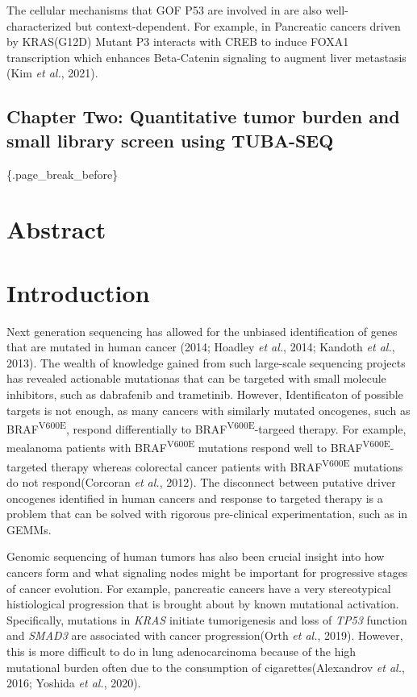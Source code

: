 The cellular mechanisms that GOF P53 are involved in are also well-characterized but context-dependent. For example, in Pancreatic cancers driven by KRAS(G12D) Mutant P3 interacts with CREB to induce FOXA1 transcription which enhances Beta-Catenin signaling to augment liver metastasis (Kim \emph{et al.}, 2021).

\hypertarget{chapter-two-quantitative-tumor-burden-and-small-library-screen-using-tuba-seq}{%
\subsection{Chapter Two: Quantitative tumor burden and small library screen using TUBA-SEQ}\label{chapter-two-quantitative-tumor-burden-and-small-library-screen-using-tuba-seq}}

\{.page\_break\_before\}

\hypertarget{abstract}{%
\section{Abstract}\label{abstract}}

\hypertarget{introduction}{%
\section{Introduction}\label{introduction}}

Next generation sequencing has allowed for the unbiased identification of genes that are mutated in human cancer (2014; Hoadley \emph{et al.}, 2014; Kandoth \emph{et al.}, 2013). The wealth of knowledge gained from such large-scale sequencing projects has revealed actionable mutationas that can be targeted with small molecule inhibitors, such as dabrafenib and trametinib. However, Identificaton of possible targets is not enough, as many cancers with similarly mutated oncogenes, such as BRAF\textsuperscript{V600E}, respond differentially to BRAF\textsuperscript{V600E}-targeed therapy. For example, mealanoma patients with BRAF\textsuperscript{V600E} mutations respond well to BRAF\textsuperscript{V600E}-targeted therapy whereas colorectal cancer patients with BRAF\textsuperscript{V600E} mutations do not respond(Corcoran \emph{et al.}, 2012). The disconnect between putative driver oncogenes identified in human cancers and response to targeted therapy is a problem that can be solved with rigorous pre-clinical experimentation, such as in GEMMs.

Genomic sequencing of human tumors has also been crucial insight into how cancers form and what signaling nodes might be important for progressive stages of cancer evolution. For example, pancreatic cancers have a very stereotypical histiological progression that is brought about by known mutational activation. Specifically, mutations in \emph{KRAS} initiate tumorigenesis and loss of \emph{TP53} function and \emph{SMAD3} are associated with cancer progression(Orth \emph{et al.}, 2019). However, this is more difficult to do in lung adenocarcinoma because of the high mutational burden often due to the consumption of cigarettes(Alexandrov \emph{et al.}, 2016; Yoshida \emph{et al.}, 2020).

